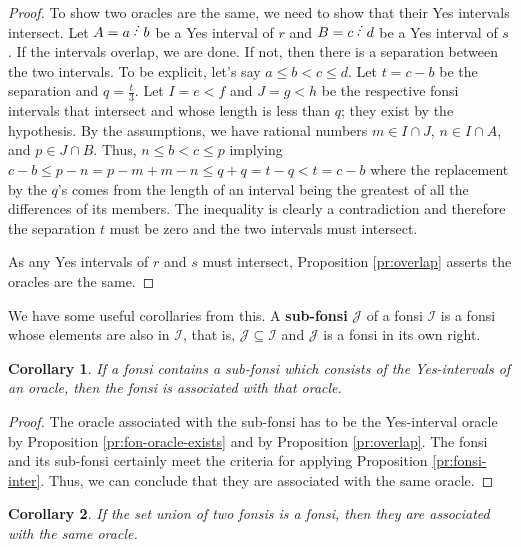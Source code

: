 \documentclass[12pt]{article}
\newtheorem{corollary}{Corollary}[subsection]
\begin{document}
\begin{proof}
To show two oracles are the same, we need to show that their Yes intervals intersect. Let $A=a\lte b$ be a Yes interval of $r$ and $B=c \lte d$ be a Yes interval of $s$. If the intervals overlap, we are done. If not, then there is a separation between the two intervals. To be explicit, let's say $a \leq b < c \leq d$. Let $t = c-b$ be the separation and $q = \frac{t}{3}$. Let $I= e\lt f$ and $J= g \lt h$ be the respective fonsi intervals that intersect and whose length is less than $q$;  they exist by the hypothesis. By the assumptions, we have rational numbers $m \in I \cap J$, $n \in I \cap A$, and $p \in J \cap B$. Thus,  $n \leq b < c \leq p$ implying $c-b \leq p - n  = p-m + m-n \leq q + q = t - q < t = c-b$ where the replacement by the $q$'s comes from the length of an interval being the greatest of all the differences of its members. The inequality is clearly a contradiction and therefore the separation $t$ must be zero and the two intervals must intersect. 
 
As any Yes intervals of $r$ and $s$ must intersect, Proposition \ref{pr:overlap} asserts the oracles are the same.  
\end{proof}

We have some useful corollaries from this. A \textbf{sub-fonsi} $\mathcal{J}$ of a fonsi $\mathcal{I}$ is a fonsi whose elements are also in $\mathcal{I}$, that is, $\mathcal{J} \subseteq \mathcal{I}$ and $\mathcal{J}$ is a fonsi in its own right.  

\begin{corollary}\label{cor:sub-fonsi}
    If a fonsi contains a sub-fonsi which consists of the Yes-intervals of an oracle, then the fonsi is associated with that oracle. 
\end{corollary}

\begin{proof}
    The oracle associated with the sub-fonsi has to be the Yes-interval oracle by Proposition \ref{pr:fon-oracle-exists} and by Proposition \ref{pr:overlap}. The fonsi and its sub-fonsi certainly meet the criteria for applying Proposition \ref{pr:fonsi-inter}. Thus, we can conclude that they are associated with the same oracle. 
\end{proof}

\begin{corollary}
    If the set union of two fonsis is a fonsi, then they are associated with the same oracle.
\end{corollary}
\end{document}
